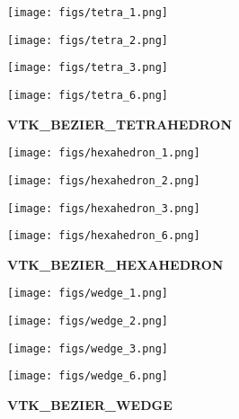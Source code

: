 \documentclass{article}
\begin{document}
\begin{center}
  \begin{minipage}{0.22\linewidth} \centering \texttt{[image: figs/tetra\_1.png]} \end{minipage}
  \begin{minipage}{0.22\linewidth} \centering \texttt{[image: figs/tetra\_2.png]} \end{minipage}
  \begin{minipage}{0.22\linewidth} \centering \texttt{[image: figs/tetra\_3.png]} \end{minipage}
  \begin{minipage}{0.22\linewidth} \centering \texttt{[image: figs/tetra\_6.png]} \end{minipage}
  {\scriptsize \textbf{VTK\_BEZIER\_TETRAHEDRON}}

  \begin{minipage}{0.22\linewidth} \centering \texttt{[image: figs/hexahedron\_1.png]} \end{minipage}
  \begin{minipage}{0.22\linewidth} \centering \texttt{[image: figs/hexahedron\_2.png]} \end{minipage}
  \begin{minipage}{0.22\linewidth} \centering \texttt{[image: figs/hexahedron\_3.png]} \end{minipage}
  \begin{minipage}{0.22\linewidth} \centering \texttt{[image: figs/hexahedron\_6.png]} \end{minipage}
  {\scriptsize \textbf{VTK\_BEZIER\_HEXAHEDRON}}

  \begin{minipage}{0.22\linewidth} \centering \texttt{[image: figs/wedge\_1.png]} \end{minipage}
  \begin{minipage}{0.22\linewidth} \centering \texttt{[image: figs/wedge\_2.png]} \end{minipage}
  \begin{minipage}{0.22\linewidth} \centering \texttt{[image: figs/wedge\_3.png]} \end{minipage}
  \begin{minipage}{0.22\linewidth} \centering \texttt{[image: figs/wedge\_6.png]} \end{minipage}
  {\scriptsize \textbf{VTK\_BEZIER\_WEDGE}}
\end{center}
\end{document}
